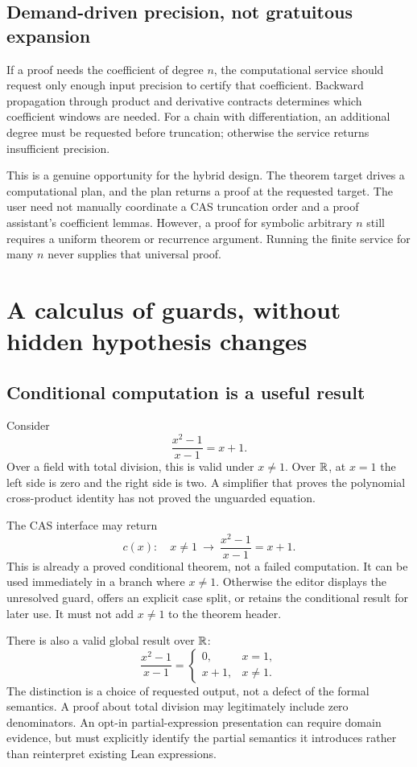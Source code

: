 \documentclass[11pt,a4paper]{article}
\theoremstyle{remark}\newtheorem{example}[proposition]{Example}
\begin{document}
\subsection{Demand-driven precision, not gratuitous expansion}
If a proof needs the coefficient of degree $n$, the computational service should request only enough input precision to certify that coefficient. Backward propagation through product and derivative contracts determines which coefficient windows are needed. For a chain with differentiation, an additional degree must be requested before truncation; otherwise the service returns insufficient precision.

This is a genuine opportunity for the hybrid design. The theorem target drives a computational plan, and the plan returns a proof at the requested target. The user need not manually coordinate a CAS truncation order and a proof assistant's coefficient lemmas. However, a proof for symbolic arbitrary $n$ still requires a uniform theorem or recurrence argument. Running the finite service for many $n$ never supplies that universal proof.

\section{A calculus of guards, without hidden hypothesis changes}\label{sec:guards}
\subsection{Conditional computation is a useful result}
Consider
\begin{equation}\label{eq:cancellation}
 \frac{x^2-1}{x-1}=x+1.
\end{equation}
Over a field with total division, this is valid under $x\ne1$. Over $\mathbb R$, at $x=1$ the left side is zero and the right side is two. A simplifier that proves the polynomial cross-product identity has not proved the unguarded equation.

The CAS interface may return
\[
 c(x):\quad x\ne1\ \longrightarrow\
       \frac{x^2-1}{x-1}=x+1.
\]
This is already a proved conditional theorem, not a failed computation. It can be used immediately in a branch where $x\ne1$. Otherwise the editor displays the unresolved guard, offers an explicit case split, or retains the conditional result for later use. It must not add $x\ne1$ to the theorem header.

There is also a valid global result over $\mathbb R$:
\[
 \frac{x^2-1}{x-1}=
 \begin{cases}0,&x=1,\\x+1,&x\ne1.\end{cases}
\]
The distinction is a choice of requested output, not a defect of the formal semantics. A proof about total division may legitimately include zero denominators. An opt-in partial-expression presentation can require domain evidence, but must explicitly identify the partial semantics it introduces rather than reinterpret existing Lean expressions.
\end{document}
